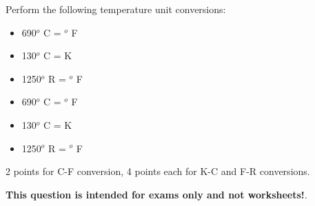 

Perform the following temperature unit conversions:

\begin{itemize}
\item{} 690$^{o}$ C = \underbar{\hskip 50pt} $^{o}$ F
\vskip 5pt
\item{} 130$^{o}$ C = \underbar{\hskip 50pt} K
\vskip 5pt
\item{} 1250$^{o}$ R = \underbar{\hskip 50pt} $^{o}$ F
\end{itemize}







\begin{itemize}
\item{} 690$^{o}$ C =  $^{o}$ F
\vskip 5pt
\item{} 130$^{o}$ C =  K
\vskip 5pt
\item{} 1250$^{o}$ R =  $^{o}$ F
\end{itemize}

2 points for C-F conversion, 4 points each for K-C and F-R conversions.







{\bf This question is intended for exams only and not worksheets!}.



